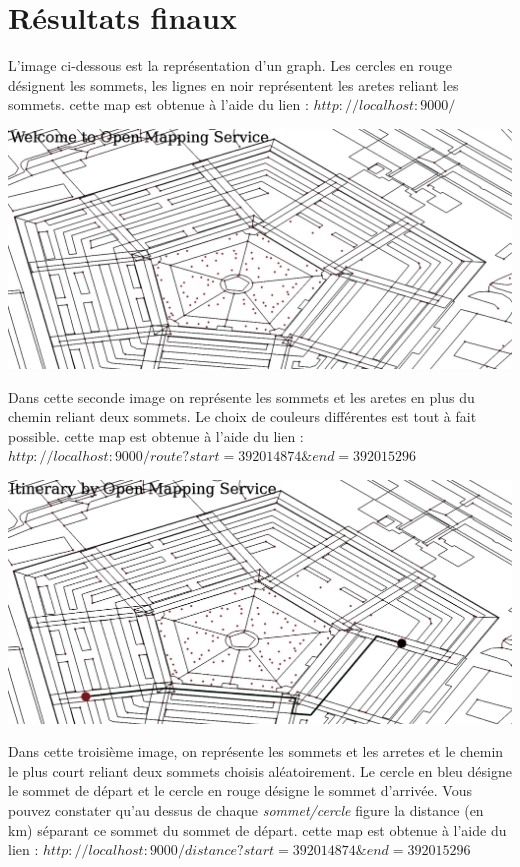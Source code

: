 \documentclass[french]{article}
\begin{document}
\section{Résultats finaux}
L'image ci-dessous est la représentation d'un graph. Les cercles en rouge désignent les sommets, les lignes en noir représentent les aretes reliant les sommets. cette map est obtenue à l'aide du lien :
$http://localhost:9000/$
\begin{center}
\includegraphics[scale=0.3]{map1.png}
\end{center}


Dans cette seconde image on représente les sommets et les aretes en plus du chemin reliant deux sommets. Le choix de couleurs différentes est tout à fait possible. cette map est obtenue à l'aide du lien :
$http://localhost:9000/route?start=392014874\&end=392015296$
\begin{center}
\includegraphics[scale=0.3]{route1.png}
\end{center}

\newpage
Dans cette troisième image, on représente les sommets et les arretes et le chemin le plus court reliant deux sommets choisis aléatoirement. Le cercle en bleu désigne le sommet de départ et le cercle en rouge désigne le sommet d'arrivée. Vous pouvez constater qu'au dessus de chaque \textit{sommet/cercle} figure la distance (en km) séparant ce sommet du sommet de départ. cette map est obtenue à l'aide du lien :
$http://localhost:9000/distance?start=392014874\&end=392015296$
\end{document}
